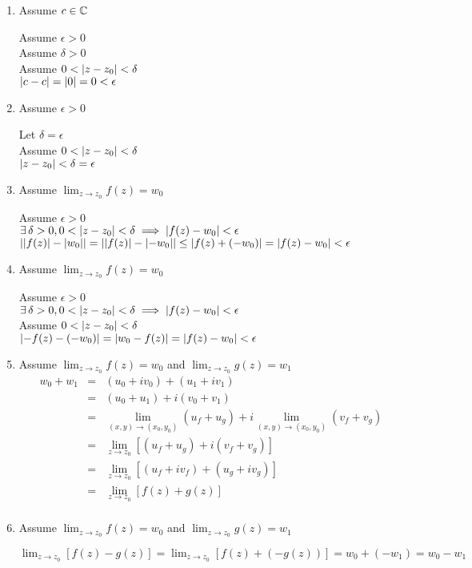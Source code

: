 \documentclass[letterpaper,12pt,fleqn]{article}
\renewcommand{\d}{\delta}
\newcommand{\e}{\epsilon}
\newcommand{\limz}{\lim_{z\to z_0}}
\newcommand{\limxy}{\lim_{(x,y)\to(x_0,y_0)}}
\begin{document}
\begin{theproof}
  \listbreak
  \begin{enumerate}
  \item Assume $c\in\mathbb{C}$

    Assume $\e>0$ \\
    Assume $\d>0$ \\
    Assume $0<\abs{z-z_0}<\d$ \\
    $\abs{c-c}=\abs{0}=0<\e$

  \item Assume $\e>0$

    Let $\d=\e$ \\
    Assume $0<\abs{z-z_0}<\d$ \\
    $\abs{z-z_0}<\d=\e$

  \item Assume $\limz{f(z)}=w_0$

    Assume $\e>0$ \\
    $\exists\,\d>0,0<\abs{z-z_0}<\d\implies\abs{f(z)-w_0}<\e$ \\
    $\abs{\abs{f(z)}-\abs{w_0}}=\abs{\abs{f(z)}-\abs{-w_0}}\le
    \abs{f(z)+(-w_0)}=\abs{f(z)-w_0}<\e$
\newpage
  \item Assume $\limz{f(z)}=w_0$

    Assume $\e>0$ \\
    $\exists\,\d>0,0<\abs{z-z_0}<\d\implies\abs{f(z)-w_0}<\e$ \\
    Assume $0<\abs{z-z_0}<\d$ \\
    $\abs{-f(z)-(-w_0)}=\abs{w_0-f(z)}=\abs{f(z)-w_0}<\e$
    
  \item Assume $\limz{f(z)}=w_0$ and $\limz{g(z)}=w_1$
    \begin{eqnarray*}
      w_0+w_1 &=& (u_0+iv_0)+(u_1+iv_1) \\
      &=& (u_0+u_1)+i(v_0+v_1) \\
      &=& \limxy{(u_f+u_g)}+i\limxy{(v_f+v_g)} \\
      &=& \limz{[(u_f+u_g)+i(v_f+v_g)]} \\
      &=& \limz{[(u_f+iv_f)+(u_g+iv_g)]} \\
      &=& \limz{[f(z)+g(z)]} \\
    \end{eqnarray*}
    
  \item Assume $\limz{f(z)}=w_0$ and $\limz{g(z)}=w_1$

    $\limz{[f(z)-g(z)]}=\limz{[f(z)+(-g(z))]}=w_0+(-w_1)=w_0-w_1$


\end{enumerate}
\end{theproof}
\end{document}
